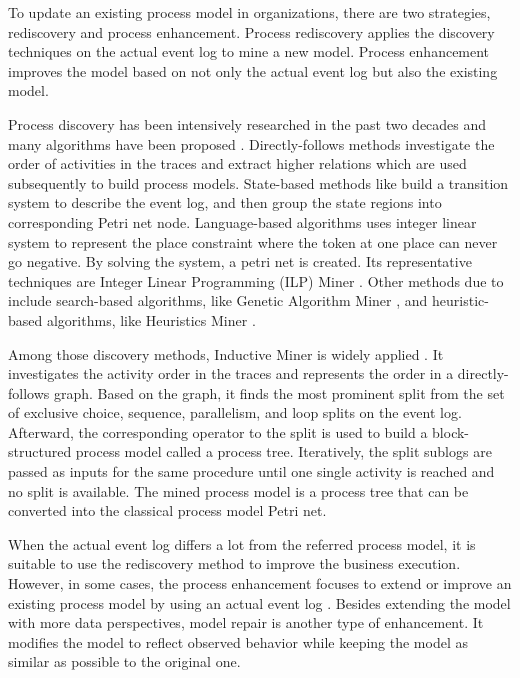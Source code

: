 To update an existing process model in organizations, there are two strategies, rediscovery and process enhancement. Process rediscovery applies the discovery techniques on the actual event log to mine a new model. Process enhancement improves the model based on not only the actual event log but also the existing model. 


Process discovery has been intensively researched in the past two decades and many algorithms have been proposed \cite{van2016data}. Directly-follows methods \cite{van2004workflow, leemans2013discovering} investigate the  order of activities in the traces and extract higher relations which are used subsequently to build process models. State-based methods like  \cite{bergenthum2007process, cortadella1995synthesizing}  build a transition system to describe the event log, and then group the state regions into corresponding Petri net node. Language-based algorithms uses integer linear system to represent the place constraint where the token at one place can never go negative. By solving the system, a petri net is created. Its representative techniques are Integer Linear Programming (ILP) Miner \cite{van2008process}. Other methods due to  \cite{van2009process} include search-based algorithms, like Genetic Algorithm Miner \cite{de2007genetic}, and heuristic-based algorithms, like Heuristics Miner \cite{weijters2003rediscovering}. 

Among those discovery methods, Inductive Miner is widely applied \cite{leemans2013discovering}. It investigates the activity order in the traces and represents the order in a directly-follows graph. Based on the graph, it finds the most prominent split from the set of exclusive choice, sequence, parallelism, and loop splits on the event log.  Afterward, the corresponding operator to the split is used to build a block-structured process model called a process tree. Iteratively, the  split sublogs are passed as inputs for the same procedure until one single activity is reached and no split is available. The mined process model is a process tree that can be converted into the classical process model Petri net. 


When the actual event log differs a lot from the referred process model, it is suitable to use the rediscovery method to improve the business execution. However, in some cases, the process enhancement focuses to extend or improve an existing process model by using an actual event log \cite{van2011process}. Besides extending the model with more data perspectives, model repair is another type of enhancement. It modifies the model to reflect observed behavior while keeping the model as similar as possible to the original one.

